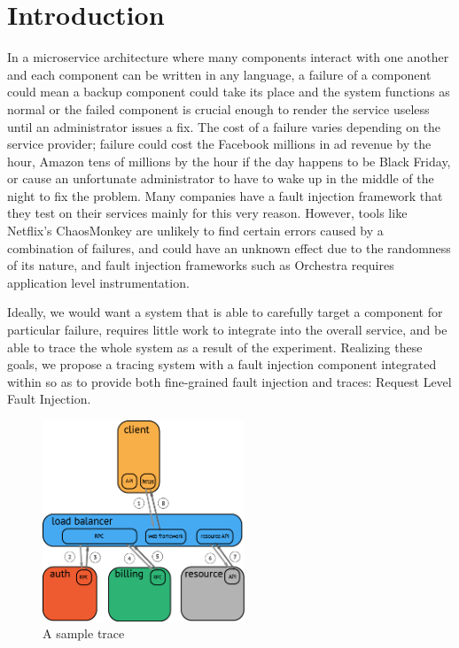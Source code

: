 \documentclass[letterpaper,twocolumn,10pt]{article}
\begin{document}
\section{Introduction}
In a microservice architecture where many components interact with one another and each component can be written in any language, a failure of a component could mean a backup component could take its place and the system functions as normal or the failed component is crucial enough to render the service useless until an administrator issues a fix. The cost of a failure varies depending on the service provider; failure could cost the Facebook millions in ad revenue by the hour, Amazon tens of millions by the hour if the day happens to be Black Friday, or cause an unfortunate administrator to have to wake up in the middle of the night to fix the problem. Many companies have a fault injection framework that they test on their services mainly for this very reason. However, tools like Netflix's ChaosMonkey\cite{netflix:chaosmonkey} are unlikely to find certain errors caused by a combination of failures\cite{alvaro:ldfi}, and could have an unknown effect due to the randomness of its nature, and fault injection frameworks such as Orchestra\cite{orchestra} requires application level instrumentation. 

Ideally, we would want a system that is able to carefully target a component for particular failure, requires little work to integrate into the overall service, and be able to trace the whole system as a result of the experiment. Realizing these goals, we propose a tracing system with a fault injection component integrated within so as to provide both fine-grained fault injection and traces: Request Level Fault Injection. 



\begin{figure}
\centering
\includegraphics[width=\textwidth,height=6cm,keepaspectratio=true]{basic_trace}
\caption{A sample trace}
\label{basic_trace}
\end{figure}
\end{document}
